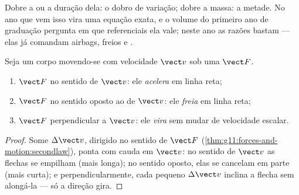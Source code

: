 \begin{remark}
Dobre a  ou a duração dela: o dobro de variação; dobre a massa: a
metade. No ano que vem isso vira uma equação exata, e o volume do
primeiro ano de graduação pergunta em que referenciais ela vale; neste
ano as razões bastam --- elas já comandam airbags, freios e .
\end{remark}

\begin{proposition}\label{prop:g11:forces-and-motion:cases}
Seja um corpo movendo-se com velocidade $\vect v$ sob uma  $\vect F$.
\begin{enumerate}
  \item $\vect F$ no sentido de $\vect v$: ele \emph{acelera} em linha
        reta;
  \item $\vect F$ no sentido oposto ao de $\vect v$: ele \emph{freia} em
        linha reta;
  \item $\vect F$ perpendicular a $\vect v$: ele \emph{vira} sem mudar de
        velocidade escalar.
\end{enumerate}
\end{proposition}

\begin{proof}
Some $\Delta\vect v$, dirigido no sentido de $\vect F$
(\cref{thm:g11:forces-and-motion:secondlaw}), ponta com cauda em
$\vect v$: no sentido de $\vect v$ as flechas se empilham (mais longa);
no sentido oposto, elas se cancelam em parte (mais curta); e
perpendicularmente, cada pequeno $\Delta \vect v$ inclina a flecha sem
alongá-la --- só a direção gira.
\end{proof}


